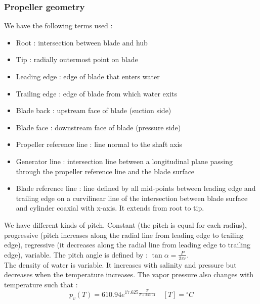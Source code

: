 \documentclass[../main.tex]{subfiles}
\begin{document}
\subsubsection{Propeller geometry}
We have the following terms used : \begin{itemize}
    \item Root : intersection between blade and hub
    \item Tip : radially outermost point on blade 
    \item Leading edge : edge of blade that enters water
    \item Trailing edge : edge of blade from which water exits
    \item Blade back : upstream face of blade (suction side)
    \item Blade face : downstream face of blade (pressure side)
    \item Propeller reference line : line normal to the shaft axis
    \item Generator line : intersection line between a longitudinal plane passing through the propeller reference line and the blade surface
    \item Blade reference line : line defined by all mid-points between leading edge and trailing edge on a curvilinear line of the intersection between blade surface and cylinder coaxial with x-axis. It extends from root to tip.
\end{itemize}
We have different kinds of pitch. Constant (the pitch is equal for each radius), progressive (pitch increases along the radial line from leading edge to trailing edge), regressive (it decreases along the radial line from leading edge to trailing edge), variable. The pitch angle is defined by : $\tan \alpha = \frac{P}{2\pi r}$.\\

The density of water is variable. It increases with salinity and pressure but decreases when the temperature increases. The vapor pressure also changes with temperature such that : \begin{equation}
    p_v(T) = 610.94 e^{17.625 \frac{T}{T+243.04}} \quad [T] = {}^\circ C 
\end{equation}
\end{document}

